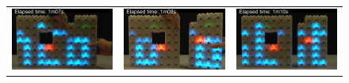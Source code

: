 {\begin{figure}[h!]
\begin{tabular}{c c c}
			\includegraphics[width=\subFigureWidth]{images/time-synchronization/scroller/sync_1m07s} &
			\includegraphics[width=\subFigureWidth]{images/time-synchronization/scroller/sync_1m08s} &
			\includegraphics[width=\subFigureWidth]{images/time-synchronization/scroller/sync_1m10s} \\
			

\end{tabular}
\end{figure}}
